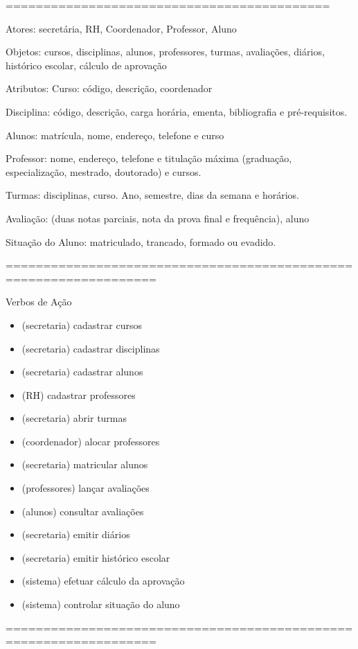 ===========================================

Atores: secretária, RH, Coordenador, Professor, Aluno

Objetos: cursos, disciplinas, alunos, professores, turmas, avaliações,
diários, histórico escolar, cálculo de aprovação

Atributos: Curso: código, descrição, coordenador

Disciplina: código, descrição, carga horária, ementa, bibliografia e
pré-requisitos.

Alunos: matrícula, nome, endereço, telefone e curso

Professor: nome, endereço, telefone e titulação máxima (graduação,
especialização, mestrado, doutorado) e cursos.

Turmas: disciplinas, curso. Ano, semestre, dias da semana e horários.

Avaliação: (duas notas parciais, nota da prova final e frequência),
aluno

Situação do Aluno: matriculado, trancado, formado ou evadido.

==================================================================

Verbos de Ação

\begin{itemize}
\item
  (secretaria) cadastrar cursos
\item
  (secretaria) cadastrar disciplinas
\item
  (secretaria) cadastrar alunos
\item
  (RH) cadastrar professores
\item
  (secretaria) abrir turmas
\item
  (coordenador) alocar professores
\item
  (secretaria) matricular alunos
\item
  (professores) lançar avaliações
\item
  (alunos) consultar avaliações
\item
  (secretaria) emitir diários
\item
  (secretaria) emitir histórico escolar
\item
  (sistema) efetuar cálculo da aprovação
\item
  (sistema) controlar situação do aluno
\end{itemize}

==================================================================

\documentclass{article}
\usepackage{tikz-uml}



